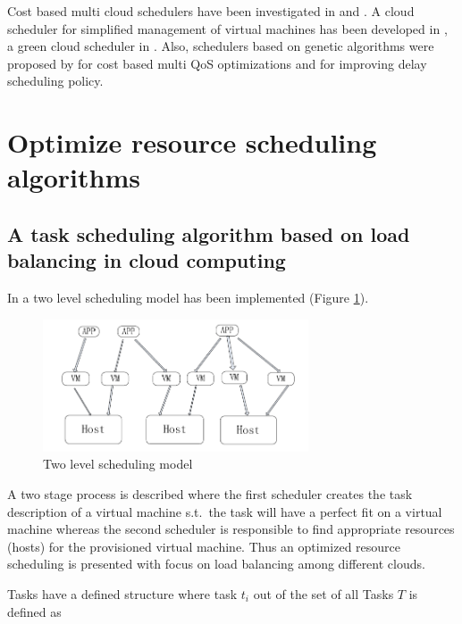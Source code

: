 Cost based multi cloud schedulers have been investigated in \cite{le2009cost} and \cite{tordsson2012cloud}. 
A cloud scheduler for simplified management of virtual machines has been developed in \cite{armstrong2010cloud}, a green cloud scheduler in \cite{lucanin2013take}. 
Also, schedulers based on genetic algorithms were proposed by \cite{dutta2011genetic} for cost based multi QoS optimizations and \cite{ge2010ga} for improving delay scheduling policy. 



\section{Optimize resource scheduling algorithms}

\subsection{A task scheduling algorithm based on load balancing in cloud computing}

In \cite{fang2010task} a two level scheduling model has been implemented (Figure \ref{fig:two_level_resource_scheduling}). 

\begin{figure}[htbp]
	\centering
		\includegraphics[width=0.7\textwidth]{figures/state_of_the_art/two_level_resource_scheduling.PNG}
	\caption{Two level scheduling model \cite{fang2010task}}
	\label{fig:two_level_resource_scheduling}
\end{figure}

A two stage process is described where the first scheduler creates the task description of a virtual machine s.t.~the task will have a perfect fit on a virtual machine whereas the second scheduler is responsible to find appropriate resources (hosts) for the provisioned virtual machine. Thus an optimized resource scheduling is presented with focus on load balancing among different clouds. 

Tasks have a defined structure where task $t_i$ out of the set of all Tasks $T$ is defined as 

